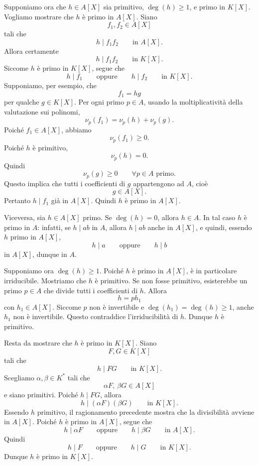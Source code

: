 \documentclass[a4paper]{article}
\begin{document}
\begin{radioactive}
\begin{snippetproof}{}
    Supponiamo ora che \(h\in A[X]\) sia primitivo, \(\deg(h)\geq 1\), e primo in \(K[X]\).
    Vogliamo mostrare che \(h\) è primo in \(A[X]\).
    Siano
    \[
        f_1,f_2\in A[X]
    \]
    tali che
    \[
        h\mid f_1f_2
        \qquad
        \text{in } A[X].
    \]
    Allora certamente
    \[
        h\mid f_1f_2
        \qquad
        \text{in } K[X].
    \]
    Siccome \(h\) è primo in \(K[X]\), segue che
    \[
        h\mid f_1
        \qquad
        \text{oppure}
        \qquad
        h\mid f_2
        \qquad
        \text{in } K[X].
    \]
    Supponiamo, per esempio, che
    \[
        f_1=hg
    \]
    per qualche \(g\in K[X]\).
    Per ogni primo \(p\in A\), usando la moltiplicatività della valutazione sui polinomi,
    \[
        \nu_p(f_1)
        =
        \nu_p(h)+\nu_p(g).
    \]
    Poiché \(f_1\in A[X]\), abbiamo
    \[
        \nu_p(f_1)\geq 0.
    \]
    Poiché \(h\) è primitivo,
    \[
        \nu_p(h)=0.
    \]
    Quindi
    \[
        \nu_p(g)\geq 0
        \qquad
        \forall p\in A \text{ primo}.
    \]
    Questo implica che tutti i coefficienti di \(g\) appartengono ad \(A\), cioè
    \[
        g\in A[X].
    \]
    Pertanto \(h\mid f_1\) già in \(A[X]\).
    Quindi \(h\) è primo in \(A[X]\).

    Viceversa, sia \(h\in A[X]\) primo.
    Se \(\deg(h)=0\), allora \(h\in A\). In tal caso \(h\) è primo in \(A\): infatti, se \(h\mid ab\) in \(A\), allora \(h\mid ab\) anche in \(A[X]\), e quindi, essendo \(h\) primo in \(A[X]\),
    \[
        h\mid a
        \qquad
        \text{oppure}
        \qquad
        h\mid b
    \]
    in \(A[X]\), dunque in \(A\).

    Supponiamo ora \(\deg(h)\geq 1\).
    Poiché \(h\) è primo in \(A[X]\), è in particolare irriducibile.
    Mostriamo che \(h\) è primitivo.
    Se non fosse primitivo, esisterebbe un primo \(p\in A\) che divide tutti i coefficienti di \(h\).
    Allora
    \[
        h=p h_1
    \]
    con \(h_1\in A[X]\). Siccome \(p\) non è invertibile e \(\deg(h_1)=\deg(h)\geq 1\), anche \(h_1\) non è invertibile.
    Questo contraddice l'irriducibilità di \(h\).
    Dunque \(h\) è primitivo.

    Resta da mostrare che \(h\) è primo in \(K[X]\).
    Siano
    \[
        F,G\in K[X]
    \]
    tali che
    \[
        h\mid FG
        \qquad
        \text{in } K[X].
    \]
    Scegliamo \(\alpha,\beta\in K^\ast\) tali che
    \[
        \alpha F,\ \beta G\in A[X]
    \]
    e siano primitivi.
    Poiché \(h\mid FG\), allora
    \[
        h\mid (\alpha F)(\beta G)
        \qquad
        \text{in } K[X].
    \]
    Essendo \(h\) primitivo, il ragionamento precedente mostra che la divisibilità avviene in \(A[X]\).
    Poiché \(h\) è primo in \(A[X]\), segue che
    \[
        h\mid \alpha F
        \qquad
        \text{oppure}
        \qquad
        h\mid \beta G
        \qquad
        \text{in } A[X].
    \]
    Quindi
    \[
        h\mid F
        \qquad
        \text{oppure}
        \qquad
        h\mid G
        \qquad
        \text{in } K[X].
    \]
    Dunque \(h\) è primo in \(K[X]\).


\end{snippetproof}
\end{radioactive}
\end{document}

